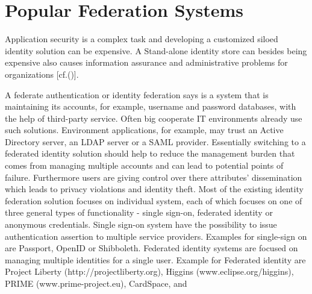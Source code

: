 \section{Popular Federation Systems}

Application security is a complex task and developing a customized siloed identity solution can be expensive. A Stand-alone identity store can besides being expensive also causes information assurance and administrative problems for organizations  [cf.(\cite{JerichoSystems:IS})]. 

A federate authentication or identity federation says \cite{Boyed:2012:GSOA} is a system that is maintaining its accounts, for example, username and password databases, with the help of third-party service. Often big cooperate IT environments already use such solutions. Environment applications, for example, may trust an Active Directory server, an LDAP server or a SAML provider. Essentially switching to a federated identity solution should help to reduce the management burden that comes from managing multiple accounts and can lead to potential points of failure.  Furthermore users are giving control over there attributes' dissemination which leads to privacy violations and identity theft. Most of the existing identity federation solution focuses on individual system, each of which focuses on one of three general types of functionality - single sign-on, federated identity or anonymous credentials. Single sign-on system have the possibility to issue authentication assertion to multiple service providers. Examples for single-sign on are Passport, OpenID or Shibboleth. Federated identity systems are focused on managing multiple identities for a single user. Example for Federated identity are Project Liberty (http://projectliberty.org), Higgins (www.eclipse.org/higgins), PRIME (www.prime-project.eu), CardSpace, and
